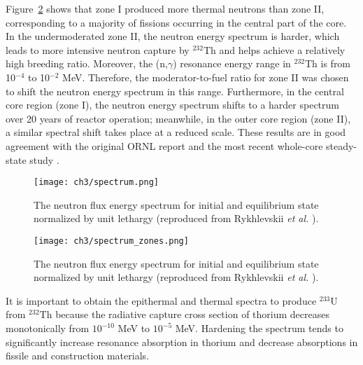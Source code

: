 Figure~\ref{fig:spectrum_zones} shows that zone I produced more thermal  
neutrons than zone II, corresponding to a majority of fissions occurring in 
the central part of the core. In the undermoderated zone II, the neutron 
energy spectrum is harder, which leads to more intensive neutron capture by 
$^{232}$Th and helps achieve a relatively high breeding ratio. Moreover, the 
(n,$\gamma$) resonance energy range in $^{232}$Th is from 10$^{-4}$ to 
10$^{-2}$ MeV. Therefore, the moderator-to-fuel ratio for zone II was chosen 
to shift the neutron energy spectrum in this range. Furthermore, in the 
central core region (zone I), the neutron energy spectrum shifts to a harder 
spectrum over 20 years of reactor operation; meanwhile, in the outer core 
region (zone II), a similar spectral shift takes place at a reduced scale. 
These results are in good agreement with the original ORNL report 
\cite{robertson_conceptual_1971} and the most recent whole-core steady-state 
study \cite{park_whole_2015}.
\begin{figure}[htp!] %
	\centering
	\texttt{[image: ch3/spectrum.png]}
	\caption{The neutron flux energy spectrum for initial and equilibrium  
	state normalized by unit lethargy (reproduced from Rykhlevskii 
	\emph{et al.} \cite{rykhlevskii_modeling_2019}).}
	\label{fig:spectrum}
\end{figure}
\begin{figure}[htp!] %
	\centering
	\texttt{[image: ch3/spectrum\_zones.png]} 
	\caption{The neutron flux energy spectrum for initial and equilibrium  
		state normalized by unit lethargy (reproduced from 
		Rykhlevskii \emph{et al.} \cite{rykhlevskii_modeling_2019}).}
	\label{fig:spectrum_zones}
\end{figure}

It is important to obtain the epithermal and thermal spectra to produce 
$^{233}$U from $^{232}$Th because the radiative capture cross section of 
thorium decreases monotonically from $10^{-10}$ MeV to $10^{-5}$ MeV. 
Hardening the spectrum tends to significantly increase resonance absorption in 
thorium and decrease absorptions in fissile and construction materials. 

